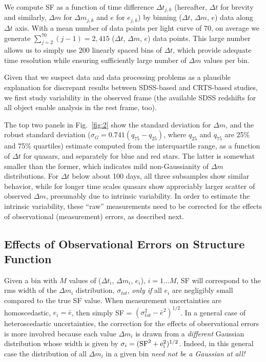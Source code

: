 \documentclass[fleqn,usenatbib]{mnras}  %
\begin{document}
We compute SF as a function of time difference $\Delta t_{j,k}$ (hereafter, $\Delta t$ for brevity and similarly, $\Delta m$ for $\Delta m_{j,k}$
and $e$ for $e_{j,k}$) by binning ($\Delta t$, $\Delta m$, $e$) data along $\Delta t$ axis.  With a mean number of data points per light curve of 
70, on average we generate $\sum_{j=2}^{70}{(j-1)} = 2,415$  ($\Delta t$, $\Delta m$, $e$) data points. This large number allows us 
to simply use 200 linearly spaced bins of $\Delta t$, which provide adequate time resolution while ensuring sufficiently
large number of  $\Delta m$ values per bin.

Given that we suspect data and data processing problems as a plausible explanation for discrepant
results between SDSS-based and CRTS-based studies, we first study variability in the observed frame (the available SDSS
redshifts for all object enable analysis in the rest frame, too). 

The top two panels in Fig.~\ref{fig:2} show the standard deviation for $\Delta m$, and the robust standard 
deviation ($\sigma_G=0.741 (q_{75} - q_{25})$, where $q_{25}$ and $q_{75}$ are 25\% and 75\% quartiles) 
estimate computed from the interquartile range, as a function of $\Delta t$ for quasars, and 
separately for blue and red stars. The latter is somewhat smaller than the former, which indicates mild 
non-Gaussianity of $\Delta m$ distributions. For $\Delta t$ below about 100 days, all three subsamples 
show similar behavior, while for longer time scales quasars show appreciably larger scatter of observed 
$\Delta m$, presumably due to intrinsic variability. In order to estimate the intrinsic variability, these ``raw'' 
measurements need to be corrected for the effects of observational (measurement) errors, as described next.



\subsection{Effects of Observational Errors on Structure Function}

Given a bin with $M$ values of ($\Delta t_i$, $\Delta m_i$, $e_i$), $i=1...M$, SF will correspond to the rms width
of the $\Delta m_i$ distribution, $\sigma_{tot}$, {\it only if} all $e_i$ are negligibly small compared to the true SF 
value. When measurement uncertainties are homoscedastic, $e_i = \bar{e}$, then simply SF = $(\sigma_{tot}^2
- \bar{e}^2)^{1/2}$. In a general case of heteroscedastic uncertainties, the correction for the effects of 
observational errors is more involved because each value $\Delta m_i$ is drawn from a {\it different}
Gaussian distribution whose width is given by $\sigma_i  = (\rm{SF}^2 + e_i^2)^{1/2}$. Indeed, in this general 
case the distribution of all $\Delta m_i$ in a given bin {\it need not be a Gaussian at all!}
\end{document}
